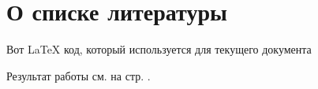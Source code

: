 \section{О списке литературы}

\noindent
Вот \LaTeX{} код, который используется для текущего документа

%
%

\begin{small}
    
\end{small}

\bigskip

Результат работы см. на стр. \pageref{thebibliography}.

\clearpage